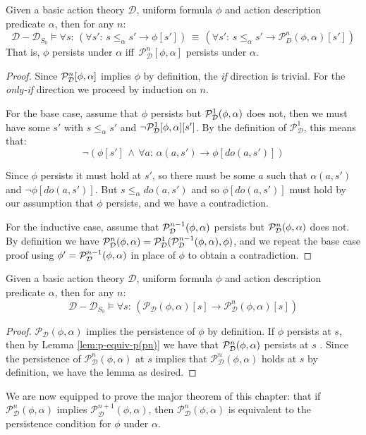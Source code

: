 \begin{lemma}
Given a basic action theory $\mathcal{D}$, uniform formula $\phi$
and action description predicate $\alpha$, then for any $n$:\label{lem:p-equiv-p(pn)}\[
\mathcal{D}-\mathcal{D}_{S_{0}}\models\forall s:\,\left(\forall s':\, s\leq_{\alpha}s'\rightarrow\phi[s']\right)\,\equiv\,\left(\forall s':\, s\leq_{\alpha}s'\rightarrow\mathcal{P}_{D}^{n}(\phi,\alpha)[s']\right)\]
 That is, $\phi$ persists under $\alpha$ iff $\,\mathcal{P}_{\mathcal{D}}^{n}[\phi,\alpha]$
persists under $\alpha$. 
\end{lemma}
\begin{proof}
Since $\mathcal{P}_{\mathcal{D}}^{n}[\phi,\alpha]$ implies $\phi$ by definition,
the \emph{if} direction is trivial. For the \emph{only-if} direction
we proceed by induction on $n$.

For the base case, assume that $\phi$ persists but $\mathcal{P}_{\mathcal{D}}^{1}(\phi,\alpha)$
does not, then we must have some $s'$ with $s\leq_{\alpha}s'$ and
$\neg\mathcal{P}_{\mathcal{D}}^{1}[\phi,\alpha][s']$. By the definition of $\mathcal{P}_{\mathcal{D}}^{1}$,
this means that:\[
\neg\left(\phi[s']\,\wedge\,\forall a:\,\alpha(a,s')\rightarrow\phi[do(a,s')]\right)\]


Since $\phi$ persists it must hold at $s'$, so there must be some
$a$ such that $\alpha(a,s')$ and $\neg\phi[do(a,s')]$. But $s\leq_{\alpha}do(a,s')$
and so $\phi[do(a,s')]$ must hold by our assumption that $\phi$
persists, and we have a contradiction.

For the inductive case, assume that $\mathcal{P}_{\mathcal{D}}^{n-1}(\phi,\alpha)$
persists but $\mathcal{P}_{\mathcal{D}}^{n}(\phi,\alpha)$ does not. By definition
we have $\mathcal{P}_{\mathcal{D}}^{n}(\phi,\alpha)=\mathcal{P}_{\mathcal{D}}^{1}(\mathcal{P}_{\mathcal{D}}^{n-1}(\phi,\alpha),\phi)$,
and we repeat the base case proof using $\phi'=\mathcal{P}_{\mathcal{D}}^{n-1}(\phi,\alpha)$
in place of $\phi$ to obtain a contradiction. 
\end{proof}
\begin{lemma}
Given a basic action theory $\mathcal{D}$, uniform formula $\phi$
and action description predicate $\alpha$, then for any $n$:\label{lem:p-implies-pn}\[
\mathcal{D}-\mathcal{D}_{S_{0}}\models\forall s:\,\left(\mathcal{P_{D}}(\phi,\alpha)[s]\rightarrow\mathcal{P}_{\mathcal{D}}^{n}(\phi,\alpha)[s]\right)\]

\end{lemma}
\begin{proof}
$\mathcal{P_{D}}(\phi,\alpha)$ implies the persistence of $\phi$
by definition. If $\phi$ persists at $s$, then by Lemma \ref{lem:p-equiv-p(pn)}
we have that $\mathcal{P}_{\mathcal{D}}^{n}(\phi,\alpha)$ persists at $s$ . Since
the persistence of $\mathcal{P}_{\mathcal{D}}^{n}(\phi,\alpha)$ at
$s$ implies that $\mathcal{P}_{\mathcal{D}}^{n}(\phi,\alpha)$ holds
at $s$ by definition, we have the lemma as desired. 
\end{proof}
We are now equipped to prove the major theorem of this chapter: that
if $\mathcal{P}_{\mathcal{D}}^{n}(\phi,\alpha)$ implies $\mathcal{P}_{\mathcal{D}}^{n+1}(\phi,\alpha)$,
then $\mathcal{P}_{\mathcal{D}}^{n}(\phi,\alpha)$ is equivalent to
the persistence condition for $\phi$ under $\alpha$.

